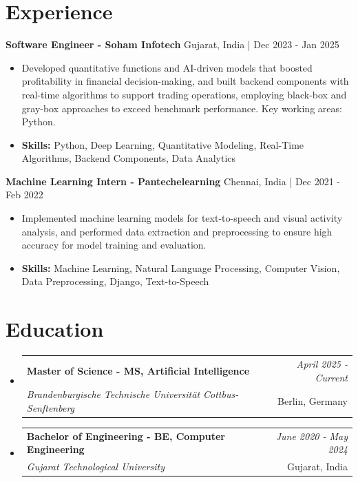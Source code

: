 \documentclass[a4paper,11pt]{article}
\makeatletter
\newcommand{\resumeSubheading}[4]{
\vspace{0.5mm}\item
    \begin{tabular*}{\linewidth}[t]{l@{\extracolsep{\fill}}r}
        \textbf{#1} & \textit{\footnotesize{#4}} \\
        \textit{\footnotesize{#3}} &  \footnotesize{#2}\\
    \end{tabular*}
    \vspace{-2.4mm}
}
\makeatother
\begin{document}
\section{\textbf{Experience}}


\vspace{1mm}
  \textbf{Software Engineer - Soham Infotech} \hfill Gujarat, India | Dec 2023 - Jan 2025
\vspace{-1.5mm} %
\begin{itemize}
  \item Developed quantitative functions and AI-driven models that boosted profitability in financial decision-making, and built backend components with real-time algorithms to support trading operations, employing black-box and gray-box approaches to exceed benchmark performance. Key working areas: Python.

\vspace{-2mm}
  \item \textbf{Skills:} Python, Deep Learning, Quantitative Modeling, Real-Time Algorithms, Backend Components, Data Analytics
\end{itemize}

\vspace{1mm}
  \textbf{Machine Learning Intern - Pantechelearning} \hfill Chennai, India | Dec 2021 - Feb 2022
\vspace{-1.5mm} %
\begin{itemize}
  \item Implemented machine learning models for text-to-speech and visual activity analysis, and performed data extraction and preprocessing to ensure high accuracy for model training and evaluation.
\vspace{-2mm}
  \item \textbf{Skills:} Machine Learning, Natural Language Processing, Computer Vision, Data Preprocessing, Django, Text-to-Speech
\end{itemize}\section{\textbf{Education}}
\vspace{-0.4mm}

\begin{itemize}[leftmargin=0.15in, label={}]
\resumeSubheading
{Master of Science - MS, Artificial Intelligence }{Berlin, Germany}
{Brandenburgische Technische Universität Cottbus-Senftenberg  }{April 2025 - Current}

\vspace{1.0mm} %
\resumeSubheading
{Bachelor of Engineering - BE, Computer Engineering  }{Gujarat, India}
{Gujarat Technological University }{June 2020 - May 2024}

\end{itemize}
\end{document}
